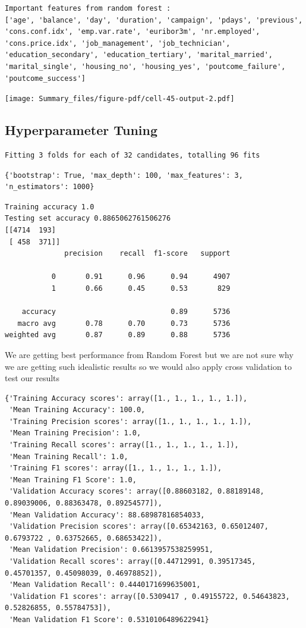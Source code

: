 \documentclass[
  letterpaper,
  DIV=11,
  numbers=noendperiod]{scrartcl}
\begin{document}
\begin{verbatim}
Important features from random forest :
['age', 'balance', 'day', 'duration', 'campaign', 'pdays', 'previous', 'cons.conf.idx', 'emp.var.rate', 'euribor3m', 'nr.employed', 'cons.price.idx', 'job_management', 'job_technician', 'education_secondary', 'education_tertiary', 'marital_married', 'marital_single', 'housing_no', 'housing_yes', 'poutcome_failure', 'poutcome_success']
\end{verbatim}

\texttt{[image: Summary\_files/figure-pdf/cell-45-output-2.pdf]}

\hypertarget{hyperparameter-tuning-1}{%
\subsection{Hyperparameter Tuning}\label{hyperparameter-tuning-1}}

\begin{verbatim}
Fitting 3 folds for each of 32 candidates, totalling 96 fits
\end{verbatim}

\begin{verbatim}
{'bootstrap': True, 'max_depth': 100, 'max_features': 3, 'n_estimators': 1000}
\end{verbatim}

\begin{verbatim}
Training accuracy 1.0
Testing set accuracy 0.8865062761506276
[[4714  193]
 [ 458  371]]
              precision    recall  f1-score   support

           0       0.91      0.96      0.94      4907
           1       0.66      0.45      0.53       829

    accuracy                           0.89      5736
   macro avg       0.78      0.70      0.73      5736
weighted avg       0.87      0.89      0.88      5736
\end{verbatim}

We are getting best performance from Random Forest but we are not sure
why we are getting such idealistic results so we would also apply cross
validation to test our results

\begin{verbatim}
{'Training Accuracy scores': array([1., 1., 1., 1., 1.]),
 'Mean Training Accuracy': 100.0,
 'Training Precision scores': array([1., 1., 1., 1., 1.]),
 'Mean Training Precision': 1.0,
 'Training Recall scores': array([1., 1., 1., 1., 1.]),
 'Mean Training Recall': 1.0,
 'Training F1 scores': array([1., 1., 1., 1., 1.]),
 'Mean Training F1 Score': 1.0,
 'Validation Accuracy scores': array([0.88603182, 0.88189148, 0.89039006, 0.88363478, 0.89254577]),
 'Mean Validation Accuracy': 88.68987816854033,
 'Validation Precision scores': array([0.65342163, 0.65012407, 0.6793722 , 0.63752665, 0.68653422]),
 'Mean Validation Precision': 0.6613957538259951,
 'Validation Recall scores': array([0.44712991, 0.39517345, 0.45701357, 0.45098039, 0.46978852]),
 'Mean Validation Recall': 0.4440171699635001,
 'Validation F1 scores': array([0.5309417 , 0.49155722, 0.54643823, 0.52826855, 0.55784753]),
 'Mean Validation F1 Score': 0.5310106489622941}
\end{verbatim}
\end{document}
